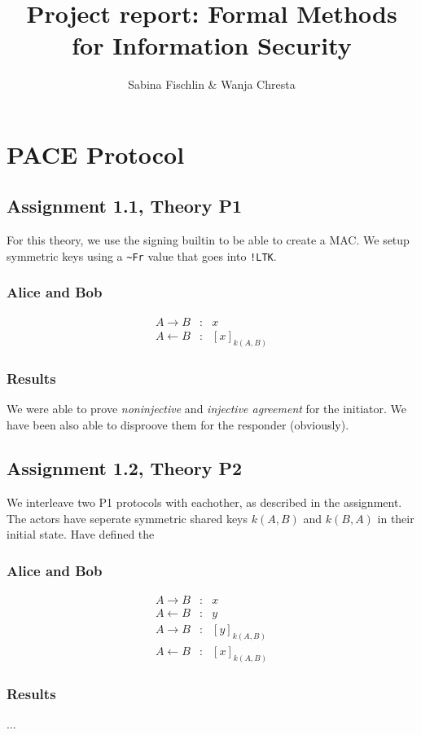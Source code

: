 \documentclass[a4paper]{article}
\title{Project report: Formal Methods for Information Security}
\author{Sabina Fischlin \& Wanja Chresta}
\begin{document}
\maketitle

\newcommand{\Fr}{\texttt{\textasciitilde{}Fr}}
\newcommand{\LTK}{\texttt{!LTK}}

\section{PACE Protocol}
\subsection{Assignment 1.1, Theory P1}
For this theory, we use the signing builtin to be able to create a MAC. We setup symmetric keys using a \Fr{} value that goes into \LTK .
\subsubsection{Alice and Bob}
\begin{eqnarray*}
A \to B        & : & x\\
A \leftarrow B & : & [x]_{k(A,B)}
\end{eqnarray*}
\subsubsection{Results}
We were able to prove {\em noninjective} and {\em injective agreement} for the initiator. We have been also able to disproove them for the responder (obviously).

\subsection{Assignment 1.2, Theory P2}
We interleave two P1 protocols with eachother, as described in the assignment. The actors have seperate symmetric shared keys $k(A,B)$ and $k(B,A)$ in their initial state.
Have defined the 
\subsubsection{Alice and Bob}
\begin{eqnarray*}
A \to B        & : & x\\
A \leftarrow B & : & y\\
A \to B        & : & [y]_{k(A,B)}\\
A \leftarrow B & : & [x]_{k(A,B)} 
\end{eqnarray*}
\subsubsection{Results}
...
\end{document}
